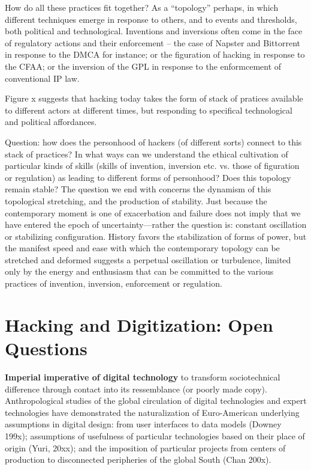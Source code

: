 \documentclass[10pt,letter,oneside]{scrartcl}
\begin{document}
How do all these practices fit together?  As a ``topology'' perhaps, in which different techniques emerge in response to others, and to events and thresholds, both political and technological.  Inventions and inversions often come in the face of regulatory actions and their enforcement -- the case of Napster and Bittorrent in response to the DMCA for instance; or the figuration of hacking in response to the CFAA; or the inversion of the GPL in response to the enformcement of conventional IP law. 

Figure x suggests that hacking today takes the form of stack of pratices available to different actors at different times, but responding to specifical technological and political affordances. 

Question: how does the personhood of hackers (of different sorts) connect to this stack of practices?  In what ways can we understand the ethical cultivation of particular kinds of skills (skills of invention, inversion etc. vs. those of figuration or regulation) as leading to different forms of personhood?  Does this topology remain stable?    The question we end with concerns the dynamism of this topological stretching, and the production of stability.  Just because the contemporary moment is one of exacerbation and failure does not imply that we have entered the epoch of uncertainty—rather the question is: constant oscillation or stabilizing configuration.  History favors the stabilization of forms of power, but the manifest speed and ease with which the contemporary topology can be stretched and deformed suggests a perpetual oscillation or turbulence, limited only by the energy and enthusiasm that can be committed to the various practices of invention, inversion, enforcement or regulation.  


\section{Hacking and Digitization: Open Questions}

{\bf Imperial imperative of digital technology} to transform sociotechnical 
difference through contact into its ressemblance (or poorly made copy). Anthropological
studies of the global circulation of digital technologies and expert technologies
have demonstrated the naturalization of Euro-American underlying assumptions in
digital design: from user interfaces to data models (Downey 199x); assumptions
of usefulness of particular technologies based on their place of origin (Yuri, 20xx); 
and the imposition of particular projects from centers of production to disconnected
peripheries of the global South (Chan 200x).
\end{document}
